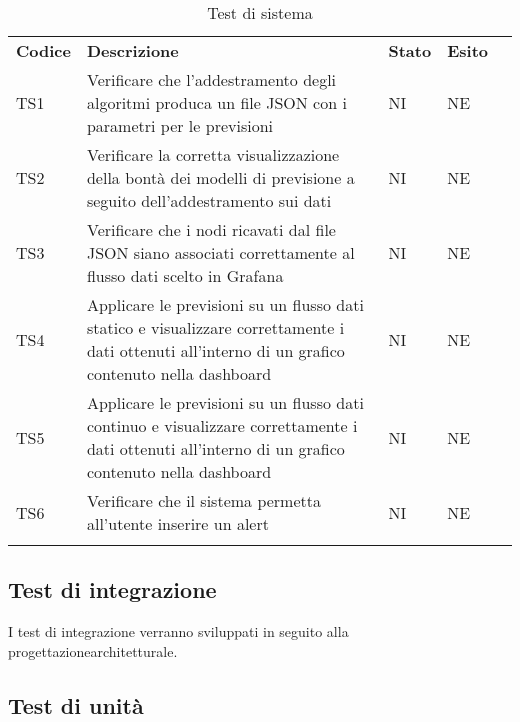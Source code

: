 \begin{longtable} {
		>{}p{15mm} 
		>{}p{79.5mm}
		>{}p{15mm} 
		>{}p{15mm}
		>{}p{0mm}}
	\rowcolor{gray!50}
	\textbf{Codice} & \textbf{Descrizione} & \textbf{Stato} & \textbf{Esito} &\TBstrut \\
	TS1 & Verificare che l'addestramento degli algoritmi produca un file JSON con i parametri per le previsioni & NI & NE  &\TBstrut \\ [2mm]
	TS2 & Verificare la corretta visualizzazione della bontà dei modelli di previsione a seguito dell'addestramento sui dati & NI & NE  &\TBstrut \\ [2mm]
	TS3 & Verificare che i nodi ricavati dal file JSON siano associati correttamente al flusso dati scelto in Grafana\glo & NI & NE  &\TBstrut \\ [2mm]
	TS4 & Applicare le previsioni su un flusso dati statico e visualizzare correttamente i dati ottenuti all'interno di un grafico contenuto nella dashboard\glo & NI & NE  &\TBstrut \\ [2mm]
	TS5 & Applicare le previsioni su un flusso dati continuo e visualizzare correttamente i dati ottenuti all'interno di un grafico contenuto nella dashboard\glo & NI & NE  &\TBstrut \\ [2mm]
	TS6 & Verificare che il sistema permetta all'utente inserire un alert\glo & NI & NE  &\TBstrut \\ [2mm]
	\rowcolor{white}
	\caption{Test di sistema}
\end{longtable}


\subsection{Test di integrazione}
I test di integrazione verranno sviluppati in seguito alla progettazione\glosp architetturale.

\subsection{Test di unità}

